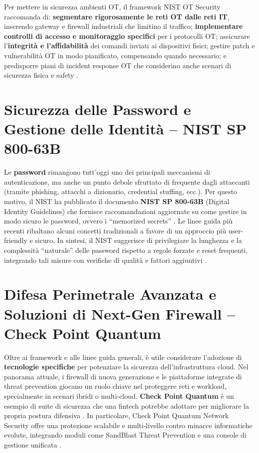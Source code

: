 \documentclass[a4paper,12pt]{report}
\begin{document}
Per mettere in sicurezza ambienti OT, il framework NIST OT Security raccomanda di: \textbf{segmentare rigorosamente le reti OT dalle reti IT}, inserendo gateway e firewall industriali che limitino il traffico; \textbf{implementare controlli di accesso e monitoraggio specifici} per i protocolli OT; assicurare l’\textbf{integrità e l’affidabilità} dei comandi inviati ai dispositivi fisici; gestire patch e vulnerabilità OT in modo pianificato, compensando quando necessario; e predisporre piani di incident response OT che considerino anche scenari di sicurezza fisica e safety \cite{nistSP80082}.

\section{Sicurezza delle Password e Gestione delle Identità – NIST SP 800-63B}
\label{sec:sicurezza_password}
Le \textbf{password} rimangono tutt’oggi uno dei principali meccanismi di autenticazione, ma anche un punto debole sfruttato di frequente dagli attaccanti (tramite phishing, attacchi a dizionario, credential stuffing, ecc.). Per questo motivo, il NIST ha pubblicato il documento \textbf{NIST SP 800-63B} (Digital Identity Guidelines) che fornisce raccomandazioni aggiornate su come gestire in modo sicuro le password, ovvero i “memorized secrets” \cite{jumpcloud}. Le linee guida più recenti ribaltano alcuni concetti tradizionali a favore di un approccio più user-friendly e sicuro. In sintesi, il NIST suggerisce di privilegiare la lunghezza e la complessità “naturale” delle password rispetto a regole forzate e reset frequenti, integrando tali misure con verifiche di qualità e fattori aggiuntivi \cite{jumpcloud}.

\section{Difesa Perimetrale Avanzata e Soluzioni di Next-Gen Firewall – Check Point Quantum}
\label{sec:checkpoint_quantum}
Oltre ai framework e alle linee guida generali, è utile considerare l’adozione di \textbf{tecnologie specifiche} per potenziare la sicurezza dell’infrastruttura cloud. Nel panorama attuale, i firewall di nuova generazione e le piattaforme integrate di threat prevention giocano un ruolo chiave nel proteggere reti e workload, specialmente in scenari ibridi o multi-cloud. \textbf{Check Point Quantum} è un esempio di suite di sicurezza che una fintech potrebbe adottare per migliorare la propria postura difensiva \cite{awsCheckPoint}. In particolare, Check Point Quantum Network Security offre una protezione scalabile e multi-livello contro minacce informatiche evolute, integrando moduli come SandBlast Threat Prevention e una console di gestione unificata \cite{awsCheckPoint}.
\end{document}
